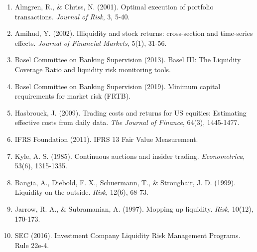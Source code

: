 \documentclass[11pt,a4paper]{article}
\begin{document}
\begin{enumerate}
    \item Almgren, R., \& Chriss, N. (2001). Optimal execution of portfolio transactions. \textit{Journal of Risk}, 3, 5-40.

    \item Amihud, Y. (2002). Illiquidity and stock returns: cross-section and time-series effects. \textit{Journal of Financial Markets}, 5(1), 31-56.

    \item Basel Committee on Banking Supervision (2013). Basel III: The Liquidity Coverage Ratio and liquidity risk monitoring tools.

    \item Basel Committee on Banking Supervision (2019). Minimum capital requirements for market risk (FRTB).

    \item Hasbrouck, J. (2009). Trading costs and returns for US equities: Estimating effective costs from daily data. \textit{The Journal of Finance}, 64(3), 1445-1477.

    \item IFRS Foundation (2011). IFRS 13 Fair Value Measurement.

    \item Kyle, A. S. (1985). Continuous auctions and insider trading. \textit{Econometrica}, 53(6), 1315-1335.

    \item Bangia, A., Diebold, F. X., Schuermann, T., \& Stroughair, J. D. (1999). Liquidity on the outside. \textit{Risk}, 12(6), 68-73.

    \item Jarrow, R. A., \& Subramanian, A. (1997). Mopping up liquidity. \textit{Risk}, 10(12), 170-173.

    \item SEC (2016). Investment Company Liquidity Risk Management Programs. Rule 22e-4.
\end{enumerate}
\end{document}
